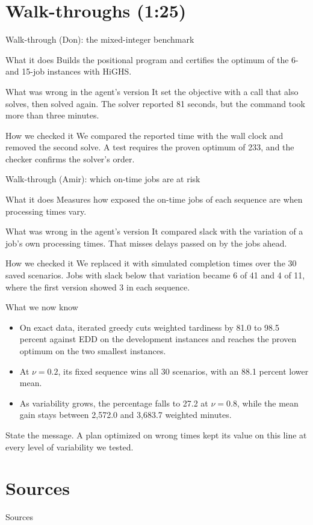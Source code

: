 \documentclass[aspectratio=169,11pt]{beamer}
\renewcommand{\fine}{\unskip\space}
\newcommand{\point}[2]{\par\medskip\sumpara #1\sumparaend
  {\color{uablue}\fin #2\fine}\par}
\begin{document}
\section{Walk-throughs (1:25)}\label{sec:walk}
\begin{frame}{Walk-through (Don): the mixed-integer benchmark}
\begin{block}{What it does}
\small Builds the positional program and certifies the optimum of the 6- and 15-job instances with HiGHS.
\end{block}
\begin{block}{What was wrong in the agent's version}
\small It set the objective with a call that also solves, then solved again. The solver reported 81 seconds, but the command took more than three minutes.
\end{block}
\begin{block}{How we checked it}
\small We compared the reported time with the wall clock and removed the second solve. A test requires the proven optimum of 233, and the checker confirms the solver's order.
\end{block}
\end{frame}

\begin{frame}{Walk-through (Amir): which on-time jobs are at risk}
\begin{block}{What it does}
\small Measures how exposed the on-time jobs of each sequence are when processing times vary.
\end{block}
\begin{block}{What was wrong in the agent's version}
\small It compared slack with the variation of a job's own processing times. That misses delays passed on by the jobs ahead.
\end{block}
\begin{block}{How we checked it}
\small We replaced it with simulated completion times over the 30 saved scenarios. Jobs with slack below that variation became 6 of 41 and 4 of 11, where the first version showed 3 in each sequence.
\end{block}
\end{frame}

\begin{frame}{What we now know}
\small
\begin{itemize}
\item On exact data, iterated greedy cuts weighted tardiness by 81.0 to 98.5 percent against EDD on the development instances and reaches the proven optimum on the two smallest instances.
\item At $\nu = 0.2$, its fixed sequence wins all 30 scenarios, with an 88.1 percent lower mean.
\item As variability grows, the percentage falls to 27.2 at $\nu = 0.8$, while the mean gain stays between 2,572.0 and 3,683.7 weighted minutes.
\end{itemize}
\point{State the message.}{A plan optimized on wrong times kept its value on this line at every level of variability we tested.}
\end{frame}

\section{Sources}\label{sec:sources}
\begin{frame}[allowframebreaks]{Sources}
\scriptsize


\end{frame}
\end{document}
